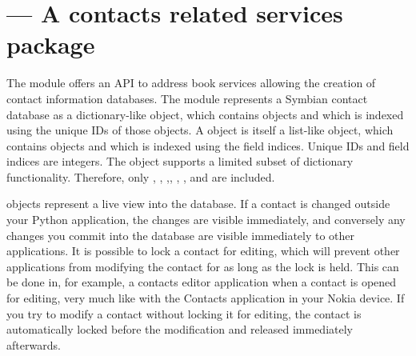 %
%
%

\section{ ---
  A contacts related services package}
\label{sec:contacts}


The  module offers an API to address book services allowing the 
creation of contact information databases. The  module 
represents a Symbian contact database as a dictionary-like  
object, which contains  objects and which is indexed using the 
unique IDs of those objects. A  object is itself a list-like 
object, which  contains  objects and which is indexed using 
the field indices. Unique IDs and field indices are integers. The 
 object supports a limited subset of dictionary functionality. 
Therefore, only , , 
,, , , and  
are included.

 objects represent a live view into the database. If a 
contact is changed outside your Python application, the changes are visible 
immediately, and conversely any changes you commit into the database are 
visible immediately to other applications. It is possible to lock a contact 
for editing, which will prevent other applications from modifying the 
contact for as long as the lock is held. This can be done in, for example, a 
contacts editor application when a contact is opened for editing, very much 
like with the Contacts application in your Nokia device. If you try to 
modify a contact without locking it for editing, the contact is 
automatically locked before the modification and released immediately 
afterwards.

